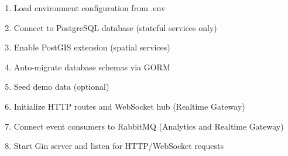 \documentclass[12pt,a4paper]{report}
\begin{document}
\begin{enumerate}
	\item Load environment configuration from .env
	\item Connect to PostgreSQL database (stateful services only)
	\item Enable PostGIS extension (spatial services)
	\item Auto-migrate database schemas via GORM
	\item Seed demo data (optional)
	\item Initialize HTTP routes and WebSocket hub (Realtime Gateway)
	\item Connect event consumers to RabbitMQ (Analytics and Realtime Gateway)
	\item Start Gin server and listen for HTTP/WebSocket requests
\end{enumerate}
\end{document}
